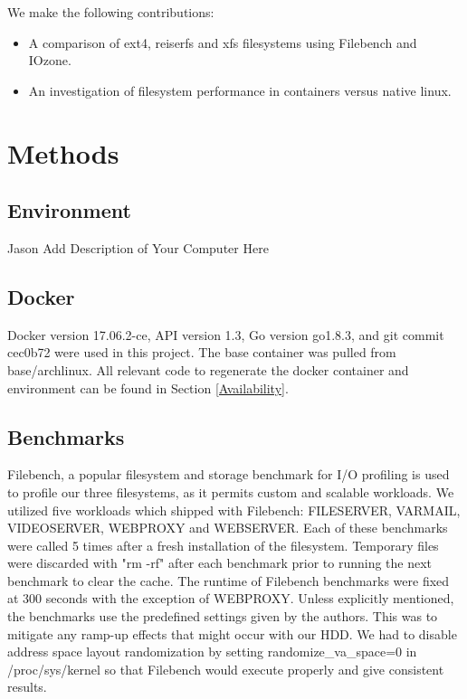 \documentclass[letterpaper,twocolumn,10pt]{article}
\begin{document}
We make the following contributions:
\begin{itemize}
  \item A comparison of ext4, reiserfs and xfs filesystems using Filebench and IOzone.
  \item An investigation of filesystem performance in containers versus native linux.
\end{itemize}

\section{Methods}

\subsection{Environment}
Jason Add Description of Your Computer Here

\subsection{Docker}
Docker version 17.06.2-ce, API version 1.3, Go version go1.8.3, and git commit cec0b72 were used in this project. The base container was pulled from base/archlinux. All relevant code to regenerate the docker container and environment can be found in Section \ref{Availability}.

\subsection{Benchmarks}
Filebench, a popular filesystem and storage benchmark for I/O profiling is used to profile our three filesystems, as it permits custom and scalable workloads. We utilized five workloads which shipped with Filebench: FILESERVER, VARMAIL, VIDEOSERVER, WEBPROXY and WEBSERVER. Each of these benchmarks were called 5 times after a fresh installation of the filesystem. Temporary files were discarded with "rm -rf" after each benchmark prior to running the next benchmark to clear the cache. The runtime of Filebench benchmarks were fixed at 300 seconds with the exception of WEBPROXY. Unless explicitly mentioned, the benchmarks use the predefined settings given by the authors. This was to mitigate any ramp-up effects that might occur with our HDD. We had to disable address space layout randomization by setting randomize\_va\_space=0 in /proc/sys/kernel so that Filebench would execute properly and give consistent results.
\end{document}
